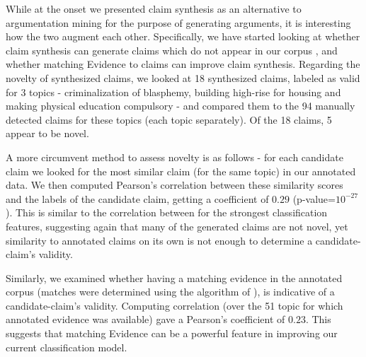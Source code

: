 \documentclass[11pt]{article}
\begin{document}
While at the onset we presented claim synthesis as an alternative to argumentation mining for the purpose of generating arguments, it is interesting how the two augment each other. Specifically, we have started looking at whether claim synthesis can generate claims which do not appear in our corpus \cite{debater}, and whether matching Evidence to claims \cite{evidence-detection} can improve claim synthesis. Regarding the novelty of synthesized claims, 
we looked at 18 synthesized claims, labeled 
as valid for 3 topics - criminalization of blasphemy, building high-rise for housing and making physical education 
compulsory - and compared them to the 94 manually detected claims for 
these topics (each topic separately). Of the 18 claims, 5 appear to be novel.

A more circumvent method to assess novelty is as follows - for each candidate claim we looked for the most similar claim (for the same topic) in our annotated data. We then computed Pearson's correlation between these similarity scores and the labels of the candidate claim, getting a coefficient of $0.29$ (p-value=$10^{-27}$). This is similar to the correlation between for the strongest classification features, suggesting again that many of the generated claims are not novel, yet similarity to annotated claims on its own is not enough to determine a candidate-claim's validity.

Similarly, we examined whether having a matching evidence in the annotated corpus (matches were determined using the algorithm of \cite{evidence-detection}), is indicative of a candidate-claim's validity. Computing correlation (over the 51 topic for which annotated evidence was available) gave a Pearson's coefficient of $0.23$. This suggests that matching Evidence can be a powerful feature in improving our current classification model.

\end{document}
